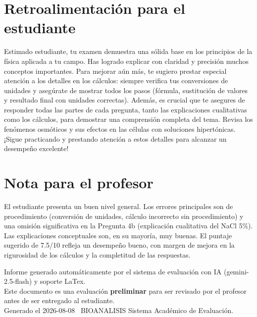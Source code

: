 \documentclass[11pt,a4paper]{article}
\begin{document}
\section*{Retroalimentación para el estudiante}
\begin{tcolorbox}[cajaRecomendacion, title={Dirigido a: Daniela Vallenilla}]
Estimado estudiante, tu examen demuestra una sólida base en los principios de la física aplicada a tu campo. Has logrado explicar con claridad y precisión muchos conceptos importantes. Para mejorar aún más, te sugiero prestar especial atención a los detalles en los cálculos: siempre verifica tus conversiones de unidades y asegúrate de mostrar todos los pasos (fórmula, sustitución de valores y resultado final con unidades correctas). Además, es crucial que te asegures de responder todas las partes de cada pregunta, tanto las explicaciones cualitativas como los cálculos, para demostrar una comprensión completa del tema. Revisa los fenómenos osmóticos y sus efectos en las células con soluciones hipertónicas. ¡Sigue practicando y prestando atención a estos detalles para alcanzar un desempeño excelente!
\end{tcolorbox}

\section*{Nota para el profesor}
\begin{tcolorbox}[
  enhanced, breakable,
  colback=yellow!8, colframe=yellow!60!black,
  fonttitle=\bfseries, coltitle=black,
  title={Observaciones para revisión manual},
  top=4pt, bottom=4pt, left=8pt, right=8pt,
]
El estudiante presenta un buen nivel general. Los errores principales son de procedimiento (conversión de unidades, cálculo incorrecto sin procedimiento) y una omisión significativa en la Pregunta 4b (explicación cualitativa del NaCl 5\%). Las explicaciones conceptuales son, en su mayoría, muy buenas. El puntaje sugerido de 7.5/10 refleja un desempeño bueno, con margen de mejora en la rigurosidad de los cálculos y la completitud de las respuestas.
\end{tcolorbox}

\vspace{12pt}
\begin{center}
  \footnotesize\color{gray}
  Informe generado automáticamente por el sistema de evaluación con IA (gemini-2.5-flash) y soporte LaTex. \\
  Este documento es una evaluación \textbf{preliminar} para ser revisado por el profesor antes de ser entregado al 
  estudiante. \\
  Generado el 2026-08-08 \textbullet\ BIOANALISIS Sistema Académico de Evaluación.
  \end{center}
\end{document}
